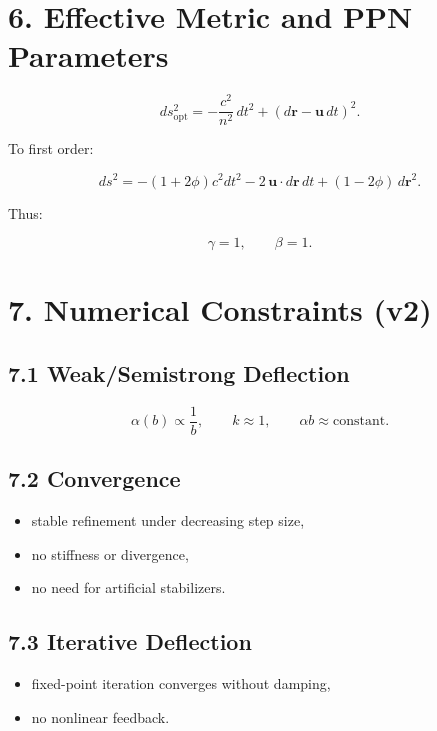 \documentclass{article}
\begin{document}
\section*{6. Effective Metric and PPN Parameters}



\[
ds_{\mathrm{opt}}^2
=
-\frac{c^2}{n^2}\,dt^2
+
(d\mathbf r - \mathbf u\,dt)^2.
\]



To first order:


\[
ds^2
=
-(1 + 2\phi)c^2 dt^2
- 2\,\mathbf u\cdot d\mathbf r\,dt
+
(1 - 2\phi)\,d\mathbf r^2.
\]



Thus:


\[
\gamma = 1,
\qquad
\beta = 1.
\]



\section*{7. Numerical Constraints (v2)}

\subsection*{7.1 Weak/Semistrong Deflection}


\[
\alpha(b) \propto \frac{1}{b},
\qquad
k \approx 1,
\qquad
\alpha b \approx \text{constant}.
\]



\subsection*{7.2 Convergence}
\begin{itemize}
    \item stable refinement under decreasing step size,
    \item no stiffness or divergence,
    \item no need for artificial stabilizers.
\end{itemize}

\subsection*{7.3 Iterative Deflection}
\begin{itemize}
    \item fixed-point iteration converges without damping,
    \item no nonlinear feedback.
\end{itemize}
\end{document}

